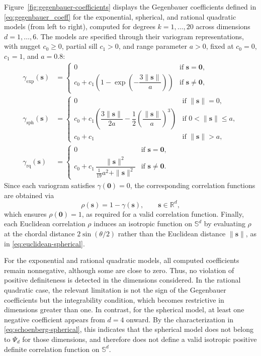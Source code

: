 \documentclass[12pt]{report} %
\newcommand{\bs}{\mathbf{s}}
\newcommand{\Sd}{\mathbb{S}^{d}}
\begin{document}
Figure~\ref{fig:gegenbauer-coefficients} displays the Gegenbauer coefficients defined in \eqref{eq:gegenbauer_coeff} for the exponential, spherical, and rational quadratic models (from left to right), computed for degrees $k=1,\ldots,20$ across dimensions $d=1,\ldots,6$. The models are specified through their variogram representations, with nugget $c_0\geq 0$, partial sill $c_1>0$, and range parameter $a>0$, fixed at $c_0=0$, $c_1=1$, and $a=0.8$:
\begin{align*}
    \gamma_{\mathrm{exp}}(\bs) &= 
    \begin{cases} 
        0 & \text{if } \bs = \mathbf{0}, \\
        c_0 + c_1\!\left(1 - \exp\!\left(-\dfrac{3\|\bs\|}{a}
        \right)\right) & \text{if } \bs \neq \mathbf{0},
    \end{cases}\\[6pt]
    \gamma_{\mathrm{sph}}(\bs) &= 
    \begin{cases} 
        0 & \text{if } \|\bs\| = 0,\\
        c_0 + c_1\!\left(\dfrac{3\|\bs\|}{2a} - 
        \dfrac{1}{2}\left(\dfrac{\|\bs\|}{a}\right)^3
        \right) & \text{if } 0 < \|\bs\| \leq a, \\
        c_0 + c_1 & \text{if } \|\bs\| > a,
    \end{cases}\\[6pt]
    \gamma_{\mathrm{rq}}(\bs) &= 
    \begin{cases} 
        0 & \text{if } \bs = \mathbf{0}, \\
        c_0 + c_1\,\dfrac{\|\bs\|^2}{\frac{1}{19}a^2 + 
        \|\bs\|^2} & \text{if } \bs \neq \mathbf{0}.
    \end{cases}
\end{align*}
Since each variogram satisfies $\gamma(\mathbf{0})=0$, the 
corresponding correlation functions are obtained via
\begin{equation}
    \label{eq:variogram-correlation}
    \rho(\bs) = 1-\gamma(\bs), \qquad \bs\in\mathbb{R}^d,
\end{equation}
which ensures $\rho(\mathbf{0})=1$, as required for a valid 
correlation function. Finally, each Euclidean correlation 
$\rho$ induces an isotropic function on $\mathbb{S}^d$ by 
evaluating $\rho$ at the chordal distance $2\sin(\theta/2)$ 
rather than the Euclidean distance $\|\bs\|$, as in 
\eqref{eq:euclidean-spherical}.

For the exponential and rational quadratic models, all computed coefficients remain nonnegative, although some are close to zero. Thus, no violation of positive definiteness is detected in the dimensions considered. In the rational
quadratic case, the relevant limitation is not the sign of the Gegenbauer coefficients but the integrability condition, which becomes restrictive in dimensions greater than one. In contrast, for the spherical model, at least one negative coefficient appears from $d=4$ onward. By the characterization in \eqref{eq:schoenberg-spherical}, this indicates that the spherical model does not belong to $\Psi_d$ for those dimensions, and therefore does not define a valid isotropic positive definite correlation function on $\Sd$.
\end{document}
